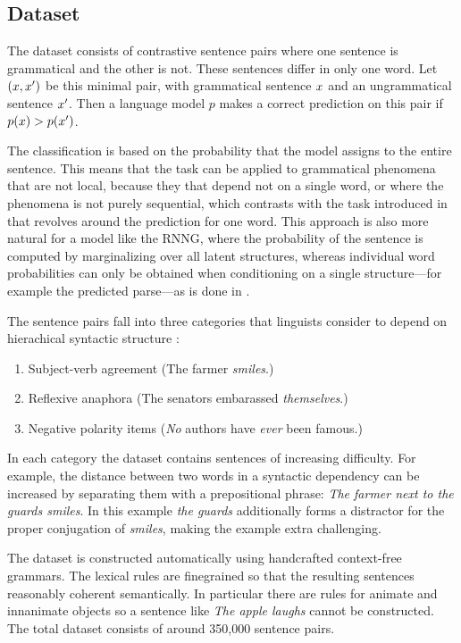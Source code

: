 \subsection{Dataset}
The \syneval dataset consists of contrastive sentence pairs where one sentence is grammatical and the other is not. These sentences differ in only one word. Let $(x, x')$ be this minimal pair, with grammatical sentence $x$ and an ungrammatical sentence $x'$. Then a language model $p$ makes a correct prediction on this pair if $p(x) > p(x')$.

The classification is based on the probability that the model assigns to the entire sentence. This means that the task can be applied to grammatical phenomena that are not local, because they that depend not on a single word, or where the phenomena is not purely sequential, which contrasts with the task introduced in \citet{linzen2016syntax} that revolves around the prediction for one word. This approach is also more natural for a model like the RNNG, where the probability of the sentence is computed by marginalizing over all latent structures, whereas individual word probabilities can only be obtained when conditioning on a single structure---for example the predicted parse---as is done in \cite{kuncoro2018learn}.

The sentence pairs fall into three categories that linguists consider to depend on hierachical syntactic structure \citep{everaert2015structures,xiang2009illusory}:
  \begin{enumerate}
    \item Subject-verb agreement (The farmer \textit{smiles}.)
    \item Reflexive anaphora (The senators embarassed \textit{themselves}.)
    \item Negative polarity items (\textit{No} authors have \textit{ever} been famous.)
  \end{enumerate}
In each category the dataset contains sentences of increasing difficulty. For example, the distance between two words in a syntactic dependency can be increased by separating them with a prepositional phrase: \textit{The farmer next to the guards smiles}. In this example \textit{the guards} additionally forms a distractor for the proper conjugation of \textit{smiles}, making the example extra challenging.

The dataset is constructed automatically using handcrafted context-free grammars. The lexical rules are finegrained so that the resulting sentences reasonably coherent semantically. In particular there are rules for animate and innanimate objects so a sentence like \textit{The apple laughs} cannot be constructed. The total dataset consists of around 350,000 sentence pairs.

